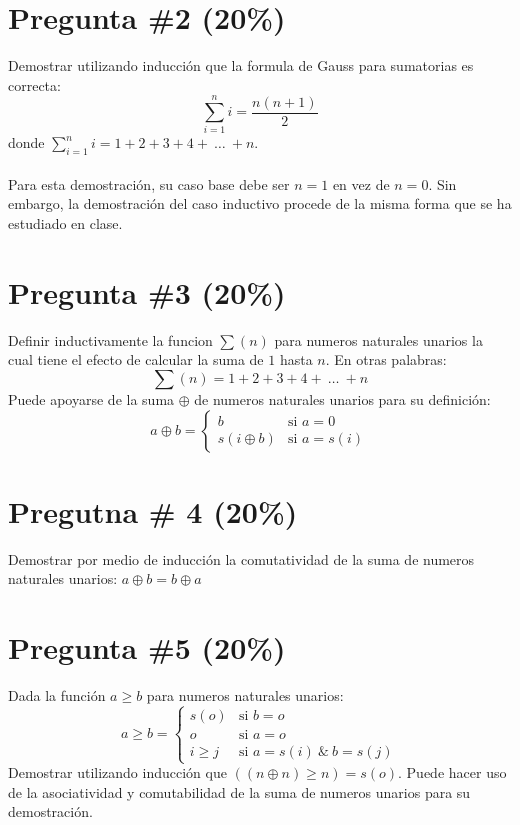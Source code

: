\documentclass{article}
\begin{document}
\section*{Pregunta \#2 (20\%)}
Demostrar utilizando inducci\'on que la formula de Gauss para sumatorias es correcta:
\[
        \sum_{i=1}^{n}{i}=\frac{n(n+1)}{2}
\]
donde $\sum_{i=1}^{n}i=1+2+3+4+\ \ldots\ +n$.
\\\\
Para esta demostraci\'on, su caso base debe ser
$n=1$ en vez de $n=0$. Sin embargo, la demostraci\'on
del caso inductivo procede de la misma forma que
se ha estudiado en clase.

\section*{Pregunta \#3 (20\%)}
Definir inductivamente la funcion $\sum(n)$ para numeros naturales unarios la cual tiene
el efecto de calcular la suma de $1$ hasta $n$. En otras palabras:
\[
        \sum(n)=1+2+3+4+\ \ldots\ +n
\]
Puede apoyarse de la suma $\oplus$ de numeros naturales unarios para su definici\'on:
\[
        a\oplus b =
                \left\{
                        \begin{array}{ll}
                                b  & \mbox{si } a = 0 \\
                                s(i\oplus b) & \mbox{si } a = s(i)
                        \end{array}
                \right.
\]

\section*{Pregutna \# 4 (20\%)}
Demostrar por medio de inducci\'on la comutatividad de la suma de
numeros naturales unarios: $a\oplus b = b\oplus a$

\section*{Pregunta \#5 (20\%)}
Dada la funci\'on $a\geq b$ para numeros naturales unarios:
\[
        a\geq b =
                \left\{
                        \begin{array}{ll}
                                s(o)  & \mbox{si } b = o \\
                                o & \mbox{si } a = o \\
                                i\geq j & \mbox{si } a = s(i)\ \&\ b = s(j)
                        \end{array}
                \right.
\]
Demostrar utilizando inducci\'on que $((n\oplus n)\geq n) = s(o)$. Puede
hacer uso de la asociatividad y comutabilidad de la suma de numeros
unarios para su demostraci\'on.
\end{document}
